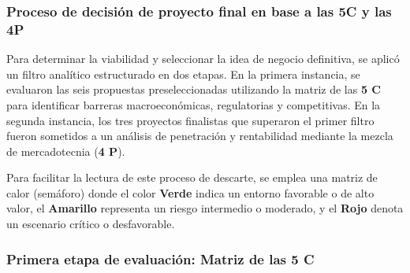 \newpage

\subsubsection{Proceso de decisión de proyecto final en base a las 5C y las 4P}

Para determinar la viabilidad y seleccionar la idea de negocio definitiva, se aplicó un filtro analítico estructurado en dos etapas. En la primera instancia, se evaluaron las seis propuestas preseleccionadas utilizando la matriz de las \textbf{5 C} para identificar barreras macroeconómicas, regulatorias y competitivas. En la segunda instancia, los tres proyectos finalistas que superaron el primer filtro fueron sometidos a un análisis de penetración y rentabilidad mediante la mezcla de mercadotecnia (\textbf{4 P}).

Para facilitar la lectura de este proceso de descarte, se emplea una matriz de calor (semáforo) donde el color \textbf{\colorbox{green!50}{Verde}} indica un entorno favorable o de alto valor, el \textbf{\colorbox{yellow!50}{Amarillo}} representa un riesgo intermedio o moderado, y el \textbf{\colorbox{red!50}{Rojo}} denota un escenario crítico o desfavorable.

\subsubsection*{Primera etapa de evaluación: Matriz de las 5 C}

